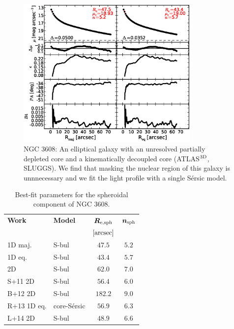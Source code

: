 \documentclass[preprint2]{emulateapj}
\newcommand{\fitfigurewidth}{0.8\textwidth}
\begin{document}
  \begin{figure}[h]
  \begin{center}
  \includegraphics[width=\fitfigurewidth]{n3608_1Dfit.eps}
  \caption{NGC 3608: 
  An elliptical galaxy with an unresolved partially depleted core \citep{rusli2013} 
  and a kinematically decoupled core (ATLAS$^{\rm 3D}$, SLUGGS). 
  We find that masking the nuclear region of this galaxy is unnnecessary and we fit the light profile with a single S\'ersic model.
  }
  \end{center}
  \end{figure}
  
  \begin{table}[h]
  \small
  \caption{Best-fit parameters for the spheroidal component of NGC 3608.}
  \begin{center}
  \begin{tabular}{llcc}
  \hline
  {\bf Work} & {\bf Model}   & $\bm R_{\rm e,sph}$    & $\bm n_{\rm sph}$ \\
    &  &  $[\rm arcsec]$ & \\
  \hline
  1D maj. & S-bul & $47.5$  &  $5.2$ \\
  1D eq.  & S-bul & $43.4$  &  $5.7$ \\
  2D      & S-bul & $62.0$  &  $7.0$ \\
  \hline
  S+11 2D         & S-bul            & $56.4$  &  $6.0$ \\
  B+12 2D         & S-bul            & $182.2$  &  $9.0$ \\
  R+13 1D eq.         & core-S\'ersic    & $56.9$  &  $6.3$ \\
  L+14 2D         & S-bul            & $48.9$  &  $6.6$ \\
  \hline
  \end{tabular}
  \end{center}
  \label{tab:n3608}
  \end{table}
\end{document}
